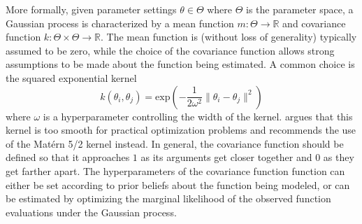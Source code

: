 More formally, given parameter settings $\theta \in \Theta$ where $\Theta$ is the parameter space, a Gaussian process is characterized by a mean function $m : \Theta \rightarrow \mathbb{R}$ and covariance function $k : \Theta \times \Theta \rightarrow \mathbb{R}$.
The mean function is (without loss of generality) typically assumed to be zero, while the choice of the covariance function allows strong assumptions to be made about the function being estimated.
A common choice is the squared exponential kernel
\begin{equation}
        k(\theta_i, \theta_j) = \mathrm{exp}\left(-\frac{1}{2\omega^2}\|\theta_i - \theta_j\|^2\right)
\end{equation}
where $\omega$ is a hyperparameter controlling the width of the kernel.
\cite{} argues that this kernel is too smooth for practical optimization problems and recommends the use of the Mat\'ern 5/2 kernel instead.
In general, the covariance function should be defined so that it approaches $1$ as its arguments get closer together and $0$ as they get farther apart.
The hyperparameters of the covariance function function can either be set according to prior beliefs about the function being modeled, or can be estimated by optimizing the marginal likelihood of the observed function evaluations under the Gaussian process.

